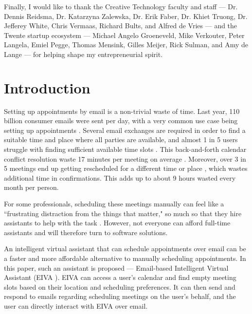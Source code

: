 \documentclass{article}
\begin{document}
Finally, I would like to thank the Creative Technology faculty and staff --- Dr. Dennis Reidsma, Dr. Katarzyna Zalewska, Dr. Erik Faber, Dr. Khiet Truong, Dr. Jefferey White, Chris Vermaas, Richard Bults, and Alfred de Vries --- and the Twente startup ecosystem --- Michael Angelo Groeneveld, Mike Verkouter, Peter Langela, Emiel Pegge, Thomas Mensink, Gilles Meijer, Rick Sulman, and Amy de Lange --- for helping shape my entrepreneurial spirit.

\newpage

\tableofcontents

\newpage

\listoftables

\newpage

\listoffigures

\newpage

\cleardoublepage
{}


\section{Introduction}

Setting up appointments by email is a non-trivial waste of time. Last year, 110 billion consumer emails were sent per day, with a very common use case being setting up appointments \cite{noauthor_email_2019}. Several email exchanges are required in order to find a suitable time and place where all parties are available, and almost 1 in 5 users struggle with finding sufficient available time slots \cite{blaszkiewicz_research_2018}. This back-and-forth calendar conflict resolution waste 17 minutes per meeting on average \cite{dennis_4_2017}. Moreover, over 3 in 5 meetings end up getting rescheduled for a different time or place \cite{dennis_how_2018}, which wastes additional time in confirmations. This adds up to about 9 hours wasted every month per person.

For some professionals, scheduling these meetings manually can feel like a ``frustrating distraction from the things that matter," so much so that they hire assistants to help with the task \cite{cranshaw_calendar.help:_2017}. However, not everyone can afford full-time assistants and will therefore turn to software solutions.

An intelligent virtual assistant that can schedule appointments over email can be a faster and more affordable alternative to manually scheduling appointments. In this paper, such an assistant is proposed --- Email-based Intelligent Virtual Assistant (EIVA ). EIVA can access a user's calendar and find empty meeting slots based on their location and scheduling preferences. It can then send and respond to emails regarding scheduling meetings on the user's behalf, and the user can directly interact with EIVA over email.
\end{document}
